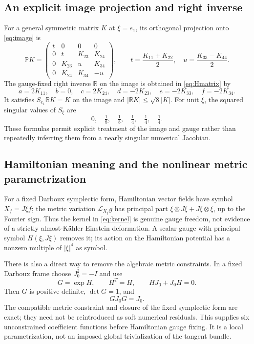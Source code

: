 \documentclass[11pt,a4paper]{article}
\numberwithin{equation}{section}
\theoremstyle{definition}\newtheorem{hypothesis}[theorem]{Input}
\theoremstyle{remark}\newtheorem{remark}[theorem]{Remark}
\begin{document}
\subsection{An explicit image projection and right inverse}
For a general symmetric matrix $K$ at $\xi=e_1$, its orthogonal projection
onto \eqref{eq:image} is
\begin{equation}
 \mathbb P K=
 \begin{pmatrix}
 t&0&0&0\\0&t&K_{23}&K_{24}\\
 0&K_{23}&u&K_{34}\\0&K_{24}&K_{34}&-u
 \end{pmatrix},\qquad
 t=\frac{K_{11}+K_{22}}2,\quad u=\frac{K_{33}-K_{44}}2.
\end{equation}
The gauge-fixed right inverse $\mathbb R$ on the image is obtained in
\eqref{eq:Hmatrix} by
\begin{equation}
 a=2K_{11},\quad b=0,\quad c=2K_{24},\quad
 d=-2K_{23},\quad e=-2K_{33},\quad f=-2K_{34}.
\end{equation}
It satisfies $S_{e_1}\mathbb R K=K$ on the image and
$|\mathbb R K|\le\sqrt8|K|$.
For unit $\xi$, the squared singular values of $S_\xi$ are
\begin{equation}
 0,\quad \tfrac18,\quad\tfrac18,\quad
 \tfrac14,\quad\tfrac14,\quad\tfrac14.
\end{equation}
These formulas permit explicit treatment of the image and gauge rather
than repeatedly inferring them from a nearly singular numerical Jacobian.

\subsection{Hamiltonian meaning and the nonlinear metric parametrization}
For a fixed Darboux symplectic form, Hamiltonian vector fields have symbol
$X_f=J\xi f$; the metric variation $\mathcal L_{X_f}g$ has principal part
$\xi\otimes J\xi+J\xi\otimes\xi$, up to the Fourier sign.  Thus the kernel
in \eqref{eq:kernel} is genuine gauge freedom, not evidence of a strictly
almost-K\"ahler Einstein deformation.  A scalar gauge with principal symbol
$H(\xi,J\xi)$ removes it; its action on the Hamiltonian potential has a
nonzero multiple of $|\xi|^4$ as symbol.

There is also a direct way to remove the algebraic metric constraints.
In a fixed Darboux frame choose $J_0^2=-I$ and use
\begin{equation}
 G=\exp H,\qquad H^T=H,\qquad HJ_0+J_0H=0.
\end{equation}
Then $G$ is positive definite, $\det G=1$, and
\begin{equation}
 GJ_0G=J_0.
\end{equation}
The compatible metric constraint and closure of the fixed symplectic form
are exact; they need not be reintroduced as soft numerical residuals.
This supplies six unconstrained coefficient functions before Hamiltonian
gauge fixing.  It is a local parametrization, not an imposed global
trivialization of the tangent bundle.
\end{document}
